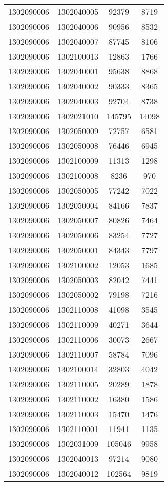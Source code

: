 \begin{longtable}[h]{llcc}
		1302090006 & 1302040005 & 92379 & 8719\\
		1302090006 & 1302040006 & 90956 & 8532\\
		1302090006 & 1302040007 & 87745 & 8106\\
		1302090006 & 1302100013 & 12863 & 1766\\
		1302090006 & 1302040001 & 95638 & 8868\\
		1302090006 & 1302040002 & 90333 & 8365\\
		1302090006 & 1302040003 & 92704 & 8738\\
		1302090006 & 1302021010 & 145795 & 14098\\
		1302090006 & 1302050009 & 72757 & 6581\\
		1302090006 & 1302050008 & 76446 & 6945\\
		1302090006 & 1302100009 & 11313 & 1298\\
		1302090006 & 1302100008 & 8236 & 970\\
		1302090006 & 1302050005 & 77242 & 7022\\
		1302090006 & 1302050004 & 84166 & 7837\\
		1302090006 & 1302050007 & 80826 & 7464\\
		1302090006 & 1302050006 & 83254 & 7727\\
		1302090006 & 1302050001 & 84343 & 7797\\
		1302090006 & 1302100002 & 12053 & 1685\\
		1302090006 & 1302050003 & 82042 & 7441\\
		1302090006 & 1302050002 & 79198 & 7216\\
		1302090006 & 1302110008 & 41098 & 3545\\
		1302090006 & 1302110009 & 40271 & 3644\\
		1302090006 & 1302110006 & 30073 & 2667\\
		1302090006 & 1302110007 & 58784 & 7096\\
		1302090006 & 1302100014 & 32803 & 4042\\
		1302090006 & 1302110005 & 20289 & 1878\\
		1302090006 & 1302110002 & 16380 & 1586\\
		1302090006 & 1302110003 & 15470 & 1476\\
		1302090006 & 1302110001 & 11941 & 1135\\
		1302090006 & 1302031009 & 105046 & 9958\\
		1302090006 & 1302040013 & 97214 & 9080\\
		1302090006 & 1302040012 & 102564 & 9819\\

\end{longtable}
